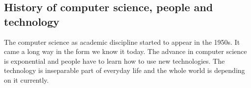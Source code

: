 \documentclass[10pt,twoside,english,a4paper]{article}
\begin{document}
\subsection{History of computer science, people and technology}
The computer science as academic discipline started to appear in the 1950s. It came a long way in the form we know it today. The advance in computer science is exponential and people have to learn how to use new technologies. The technology is inseparable part of everyday life and the whole world is depending on it currently.






\end{document}
